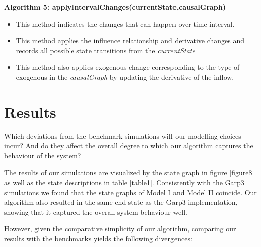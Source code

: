 \documentclass{article}
\begin{document}
\textbf{Algorithm 5: applyIntervalChanges(currentState,causalGraph)}
\begin{itemize}
	\item This method indicates the changes that can happen over time interval.
	\item This method applies the influence relationship and derivative changes and records all possible state transitions from the \textit{currentState}
	\item This method also applies exogenous change corresponding to the type of exogenous in the \textit{causalGraph} by updating the derivative of the inflow.  
\end{itemize}

\section{Results}

Which deviations from the benchmark simulations will our modelling choices incur? And do they affect the overall degree to which our algorithm captures the behaviour of the system? 

The results of our simulations are visualized by the state graph in figure \ref{figure8} as well as the state descriptions in table \ref{table1}. Consistently with the Garp3 simulations we found that the state graphs of Model I and Model II coincide. Our algorithm also resulted in the same end state as the Garp3 implementation, showing that it captured the overall system behaviour well.

However, given the comparative simplicity of our algorithm, comparing our results with the benchmarks yields the following divergences:
\end{document}
